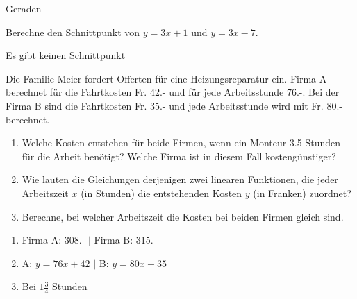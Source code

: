 \documentclass[a4paper,10pt]{article}
\begin{document}
\begin{exerciseseries}[columns=2]{Geraden}
  \begin{exercise}
    Berechne den Schnittpunkt von \mbox{$y=3x+1$} und \mbox{$y=3x-7$}.
  \end{exercise}
  \begin{solution}
    Es gibt keinen Schnittpunkt
  \end{solution}

  \begin{exercise}
    Die Familie Meier fordert Offerten f\"ur eine Heizungsreparatur
    ein. Firma A berechnet f\"ur die Fahrtkosten Fr. 42.- und f\"ur
    jede Arbeitsstunde 76.-. Bei der Firma B sind die Fahrtkosten
    Fr. 35.- und jede Arbeitsstunde wird mit Fr. 80.- berechnet.
    \begin{enumerate}[label=\alph*)]
    \item Welche Kosten entstehen f\"ur beide Firmen, wenn ein Monteur
      3.5 Stunden
      f\"ur die Arbeit benötigt? Welche Firma ist in diesem Fall
      kostengünstiger?

    \item Wie lauten die Gleichungen derjenigen zwei linearen
      Funktionen, die jeder Arbeitszeit $x$ (in Stunden) die
      entstehenden Kosten $y$ (in Franken) zuordnet?

    \item Berechne, bei welcher Arbeitszeit die Kosten bei beiden
      Firmen gleich sind.
    \end{enumerate}
  \end{exercise}
  \begin{solution}
    \begin{enumerate}[label=\alph*)]
    \item Firma A: 308.- $|$ Firma B: 315.-
    \item A: $y=76x+42$ $|$ B: $y=80x+35$
    \item Bei $1\frac{3}{4}$ Stunden
    \end{enumerate}
  \end{solution}
\end{exerciseseries}

\section{\solutionsname}
\loadSolutions
\end{document}
